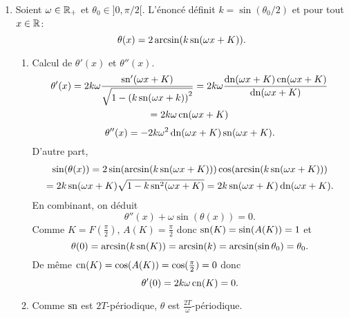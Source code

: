 \begin{enumerate}
 \item Soient $\omega \in \mathbb{R}_{+}$ et $\theta_{0}\in ]0, \pi / 2[$. L'énoncé définit $k = \sin(\theta_{0}/2)$ et pour tout $x\in \mathbb{R}$:
\[ \theta(x) = 2\arcsin(k\operatorname{sn}(\omega x + K)).\]
\begin{enumerate}
 \item Calcul de $\theta'(x)$ et $\theta''(x)$.
\begin{multline*}
 \theta'(x) = 2 k \omega \frac{\operatorname{sn}'(\omega x + K)}{\sqrt{1 -\left( k \operatorname{sn}(\omega x +k)\right)^2 }}
 = 2 k \omega \frac{\operatorname{dn} (\omega x + K) \operatorname{cn} (\omega x + K)}{ \operatorname{dn}(\omega x + K)}\\
 = 2 k \omega \operatorname{cn} (\omega x + K)
\end{multline*}
\[
 \theta''(x) 
 = -2 k \omega^2 \operatorname{dn} (\omega x + K) \operatorname{sn} (\omega x + K).
\]
D'autre part,
\begin{multline*}
 \sin(\theta(x)) = 2 \sin(\arcsin(k\operatorname{sn}(\omega x + K)))\cos(\arcsin(k\operatorname{sn}(\omega x + K)))\\
 = 2k\operatorname{sn}(\omega x + K) \sqrt{1-k\operatorname{sn}^2(\omega x + K)}
 = 2k\operatorname{sn}(\omega x + K) \operatorname{dn}(\omega x + K).
\end{multline*}
En combinant, on déduit
\[
 \theta''(x) + \omega \sin(\theta(x)) = 0.
\]
Comme $K = F(\frac{\pi}{2})$, $A(K) = \frac{\pi}{2}$ donc $\operatorname{sn}(K) = \sin (A(K)) = 1$ et 
\[
 \theta(0) = \arcsin(k\operatorname{sn}(K)) = \arcsin(k) = \arcsin(\sin \theta_0) = \theta_0.
\]
De même $\operatorname{cn}(K) = \cos (A(K)) = \cos (\frac{\pi}{2}) = 0$ donc 
\[
 \theta'(0) = 2k\omega \operatorname{cn}(K) = 0. 
\]

 \item Comme $\operatorname{sn}$ est $2T$-périodique, $\theta$ est $\frac{2T}{\omega}$-périodique.
\end{enumerate}

\end{enumerate}
